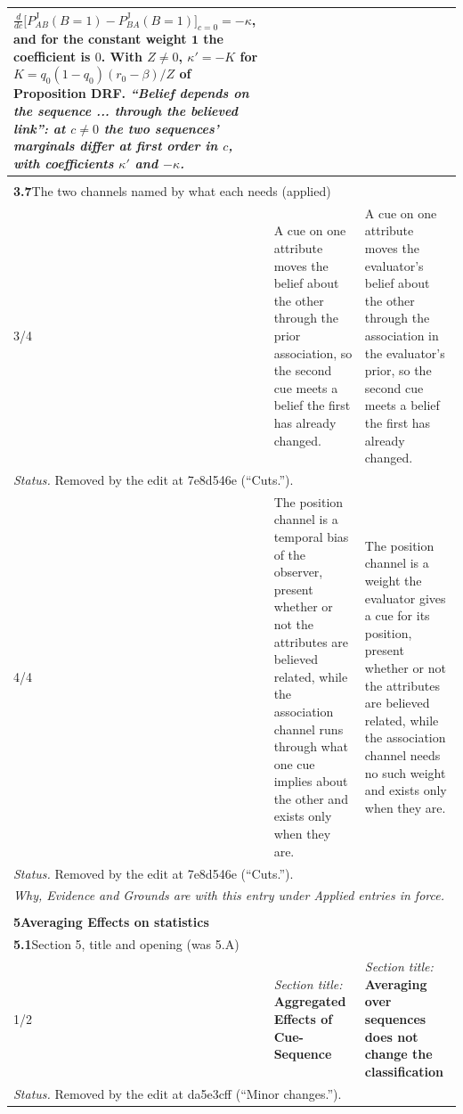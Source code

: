 \documentclass[10pt]{article}
\theoremstyle{definition}
\newcommand{\PJ}{P^{\mathrm{J}}}
\newlength{\fullw}\setlength{\fullw}{25.9cm}
\newcommand{\entryhead}[2]{\multicolumn{3}{|l|}{\rule{0pt}{2.6ex}\large\textbf{#1}\quad #2} \\ \hline}
\begin{document}
{\begin{longtable}{|p{0.9cm}|p{12.2cm}|p{12.2cm}|}
{$\frac{d}{dc}\bigl[\PJ_{AB}(B{=}1)-\PJ_{BA}(B{=}1)\bigr]_{c=0}=-\kappa$, and for the
constant weight $\mathbf 1$ the coefficient is $0$. With $Z\neq0$,
$\kappa'=-K$ for $K=q_0(1-q_0)(r_0-\beta)/Z$ of Proposition DRF. \newline \textit{``Belief depends on the sequence ... through the believed link'': at $c\neq0$ the two sequences' marginals differ at first order in $c$, with coefficients $\kappa'$ and $-\kappa$.}} \\ \hline
\multicolumn{3}{|l|}{} \\ \hline
\entryhead{3.7}{The two channels named by what each needs (applied)\quad{\footnotesize\textit{(formerly C.23)}}}
3/4 & A cue on one attribute moves the belief about the other through the prior association, so the second cue meets a belief the first has already changed. & A cue on one attribute moves the evaluator's belief about the other through the association in the evaluator's prior, so the second cue meets a belief the first has already changed. \\ \hline
\multicolumn{3}{|p{\fullw}|}{\textit{Status.} Removed by the edit at 7e8d546e (``Cuts.'').} \\ \hline
4/4 & The position channel is a temporal bias of the observer, present whether or not the attributes are believed related, while the association channel runs through what one cue implies about the other and exists only when they are. & The position channel is a weight the evaluator gives a cue for its position, present whether or not the attributes are believed related, while the association channel needs no such weight and exists only when they are. \\ \hline
\multicolumn{3}{|p{\fullw}|}{\textit{Status.} Removed by the edit at 7e8d546e (``Cuts.'').} \\ \hline
\multicolumn{3}{|p{\fullw}|}{\textit{Why, Evidence and Grounds are with this entry under Applied entries in force.}} \\ \hline
\multicolumn{3}{|l|}{} \\ \hline
\multicolumn{3}{|l|}{\rule{0pt}{3.2ex}\Large\textbf{5\quad Averaging Effects on statistics}} \\ \hline\hline
\entryhead{5.1}{Section 5, title and opening (was 5.A)\quad{\footnotesize\textit{(formerly E.9)}}}
1/2 & \textit{Section title:} \textbf{Aggregated Effects of Cue-Sequence} & \textit{Section title:} \textbf{Averaging over sequences does not change the classification} \\ \hline
\multicolumn{3}{|p{\fullw}|}{\textit{Status.} Removed by the edit at da5e3cff (``Minor changes.'').} \\ \hline

\end{longtable}}
\end{document}
